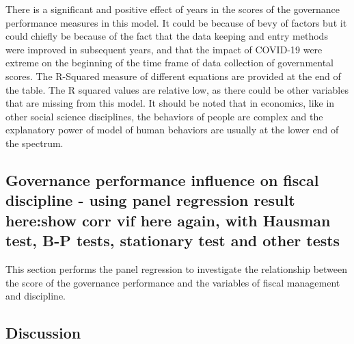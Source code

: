 There is a significant and positive effect of years in the scores of the governance performance measures in this model. It could be because of bevy of factors but it could chiefly be because of the fact that the data keeping and entry methods were improved in subsequent years, and that the impact of COVID-19 were extreme on the beginning of the time frame of data collection of governmental scores. The R-Squared measure of different equations are provided at the end of the table. The R squared values are relative low, as there could be other variables that are missing from this model.  It should be noted that in economics, like in other social science disciplines, the behaviors of people are complex and the explanatory power of model of human behaviors are usually at the lower end of the spectrum.\\
\subsection{Governance performance influence on fiscal discipline - using panel regression result here:show corr vif here again, with Hausman test, B-P tests, stationary test and other tests}
This section performs the panel regression to investigate the relationship between the score of the governance performance and the variables of fiscal management and discipline. 




\subsection{Discussion}

